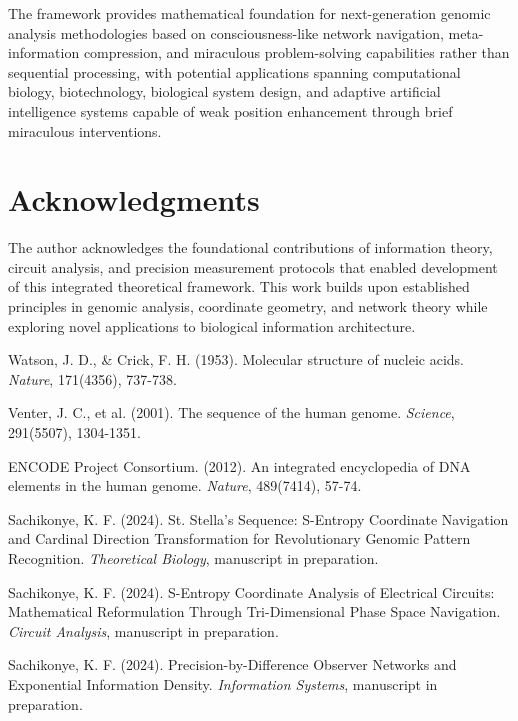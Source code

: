 \documentclass[12pt,a4paper]{article}
\begin{document}
\begin{table}[H]
The framework provides mathematical foundation for next-generation genomic analysis methodologies based on consciousness-like network navigation, meta-information compression, and miraculous problem-solving capabilities rather than sequential processing, with potential applications spanning computational biology, biotechnology, biological system design, and adaptive artificial intelligence systems capable of weak position enhancement through brief miraculous interventions.

\section*{Acknowledgments}

The author acknowledges the foundational contributions of information theory, circuit analysis, and precision measurement protocols that enabled development of this integrated theoretical framework. This work builds upon established principles in genomic analysis, coordinate geometry, and network theory while exploring novel applications to biological information architecture.


\begin{thebibliography}{99}

Watson, J. D., \& Crick, F. H. (1953). Molecular structure of nucleic acids. \textit{Nature}, 171(4356), 737-738.

Venter, J. C., et al. (2001). The sequence of the human genome. \textit{Science}, 291(5507), 1304-1351.

ENCODE Project Consortium. (2012). An integrated encyclopedia of DNA elements in the human genome. \textit{Nature}, 489(7414), 57-74.

Sachikonye, K. F. (2024). St. Stella's Sequence: S-Entropy Coordinate Navigation and Cardinal Direction Transformation for Revolutionary Genomic Pattern Recognition. \textit{Theoretical Biology}, manuscript in preparation.

Sachikonye, K. F. (2024). S-Entropy Coordinate Analysis of Electrical Circuits: Mathematical Reformulation Through Tri-Dimensional Phase Space Navigation. \textit{Circuit Analysis}, manuscript in preparation.

Sachikonye, K. F. (2024). Precision-by-Difference Observer Networks and Exponential Information Density. \textit{Information Systems}, manuscript in preparation.


\end{thebibliography}
\end{table}
\end{document}
